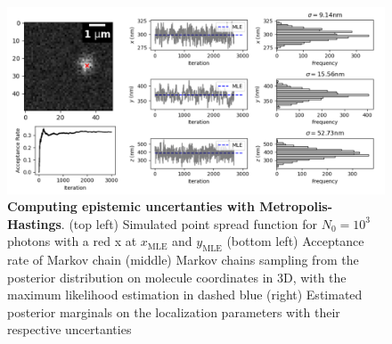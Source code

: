 \documentclass{ucetd}
\begin{document}
\begin{figure}
\begin{center}
\includegraphics[width=16cm]{MCMC.png}
\end{center}
\caption{\textbf{Computing epistemic uncertanties with Metropolis-Hastings}. (top left) Simulated point spread function for $N_{0}=10^{3}$ photons with a red x at $x_{\mathrm{MLE}}$ and $y_{\mathrm{MLE}}$ (bottom left) Acceptance rate of Markov chain (middle) Markov chains sampling from the posterior distribution on molecule coordinates in 3D, with the maximum likelihood estimation in dashed blue (right) Estimated posterior marginals on the localization parameters with their respective uncertanties}
\end{figure}

\end{document}

